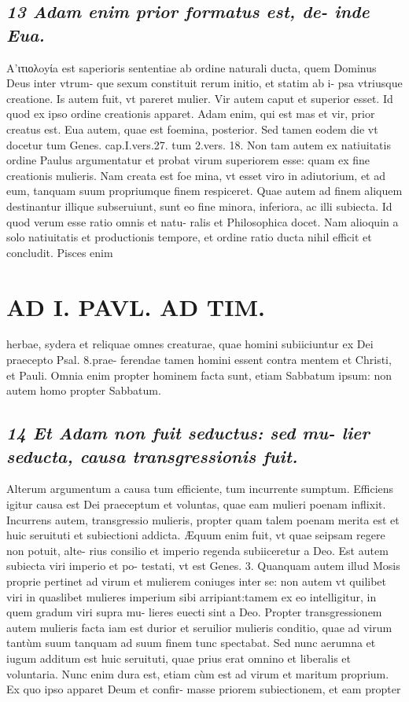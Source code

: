 \documentclass{article}
\begin{document}
\begin{pages}
\subsection*{\textit{13 Adam enim prior formatus est, de- inde Eua. }}\pstart A’ιτιολoyίa est saperioris sententiae ab ordine naturali ducta, quem Dominus Deus inter vtrum- que sexum constituit rerum initio, et statim ab i- psa vtriusque creatione. Is autem fuit, vt pareret mulier. Vir autem caput et superior esset. Id quod ex ipso ordine creationis apparet. Adam enim, qui est mas et vir, prior creatus est. Eua autem, quae est foemina, posterior. Sed tamen eodem die vt docetur tum Genes. cap.I.vers.27. tum 2.vers. 18. Non tam autem ex natiuitatis ordine Paulus argumentatur et probat virum superiorem esse: quam ex fine creationis mulieris. Nam creata est foe mina, vt esset viro in adiutorium, et ad eum, tanquam suum propriumque finem respiceret. Quae autem ad finem aliquem destinantur illique  subseruiunt, sunt eo fine minora, inferiora, ac illi subiecta. Id quod verum esse ratio omnis et natu- ralis et Philosophica docet. Nam alioquin a solo natiuitatis et productionis tempore, et ordine ratio ducta nihil efficit et concludit. Pisces enim  \pend
\section*{AD I. PAVL. AD TIM. }
\marginpar{[ p.88 ]}\pstart herbae, sydera et reliquae omnes creaturae, quae homini subiiciuntur ex Dei praecepto Psal. 8.prae- ferendae tamen homini essent contra mentem et Christi, et Pauli. Omnia enim propter hominem facta sunt, etiam Sabbatum ipsum: non autem homo propter Sabbatum.  \pend
{}
{}
\subsection*{\textit{14 Et Adam non fuit seductus: sed mu- lier seducta, causa transgressionis fuit. }}\pstart Alterum argumentum a causa tum efficiente, tum incurrente sumptum. Efficiens igitur causa est Dei praeceptum et voluntas, quae eam mulieri poenam inflixit. Incurrens autem, transgressio mulieris, propter quam talem poenam merita est et huic seruituti et subiectioni addicta. Æquum enim fuit, vt quae seipsam regere non potuit, alte- rius consilio et imperio regenda subiiceretur a Deo. Est autem subiecta viri imperio et po- testati, vt est Genes. 3. Quanquam autem illud Mosis proprie pertinet ad virum et mulierem coniuges inter se: non autem vt quilibet viri in quaslibet mulieres imperium sibi arripiant:tamem ex eo intelligitur, in quem gradum viri supra mu- lieres euecti sint a Deo. Propter transgressionem autem mulieris facta iam est durior et seruilior mulieris conditio, quae ad virum tantùm suum tanquam ad suum finem tunc spectabat. Sed nunc aerumna et iugum additum est huic seruituti, quae prius erat omnino et liberalis et voluntaria. Nunc enim dura est, etiam cùm est ad virum et maritum proprium. Ex quo ipso apparet Deum et confir- masse priorem subiectionem, et eam propter  \pend

\end{pages}
\end{document}
